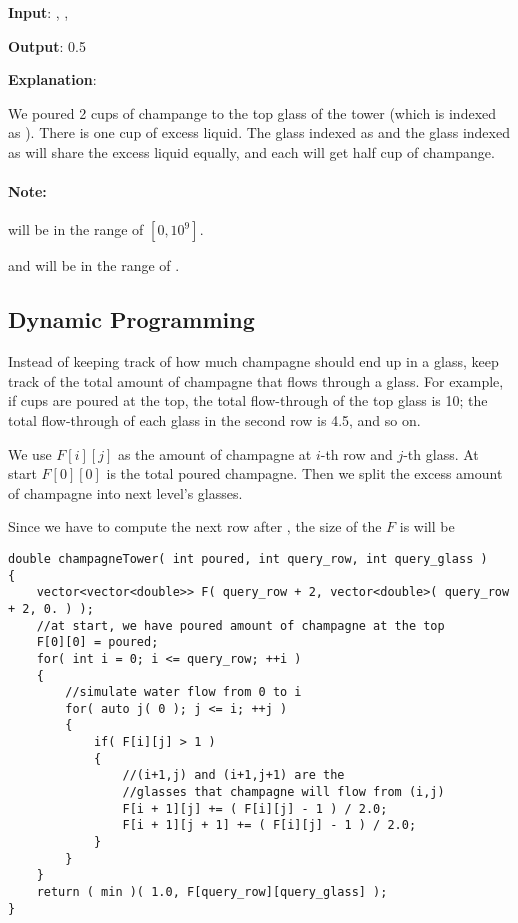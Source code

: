 \begin{flushleft}
\textbf{Input}: , , 

\textbf{Output}: 0.5

\textbf{Explanation}: 

We poured 2 cups of champange to the top glass of the tower (which is indexed as ). There is one cup of excess liquid. The glass indexed as  and the glass indexed as  will share the excess liquid equally, and each will get half cup of champange.
\end{flushleft}
 

\paragraph{Note:}

\begin{flushleft}
\item {} will be in the range of $ [0, 10 ^ 9] $.
\item {} and  will be in the range of \fcj{[0, 99]}.
\end{flushleft}

\subsection{Dynamic Programming}
Instead of keeping track of how much champagne should end up in a glass, keep track of the total amount of champagne that flows through a glass. For example, if  cups are poured at the top, the total flow-through of the top glass is 10; the total flow-through of each glass in the second row is 4.5, and so on.

We use $F[i][j]$ as the amount of champagne at $i$-th row and $j$-th glass. At start $F[0][0]$ is the total poured champagne. Then we split the excess amount of champagne into next level's glasses.

Since we have to compute the next row after , the size of the $F$ is will be 

\setcounter{lstlisting}{0}
\begin{lstlisting}[style=customc, caption={Simulation}]
double champagneTower( int poured, int query_row, int query_glass )
{
    vector<vector<double>> F( query_row + 2, vector<double>( query_row + 2, 0. ) );
    //at start, we have poured amount of champagne at the top
    F[0][0] = poured;
    for( int i = 0; i <= query_row; ++i )
    {
        //simulate water flow from 0 to i
        for( auto j( 0 ); j <= i; ++j )
        {
            if( F[i][j] > 1 )
            {
                //(i+1,j) and (i+1,j+1) are the
                //glasses that champagne will flow from (i,j)
                F[i + 1][j] += ( F[i][j] - 1 ) / 2.0;
                F[i + 1][j + 1] += ( F[i][j] - 1 ) / 2.0;
            }
        }
    }
    return ( min )( 1.0, F[query_row][query_glass] );
}
\end{lstlisting}